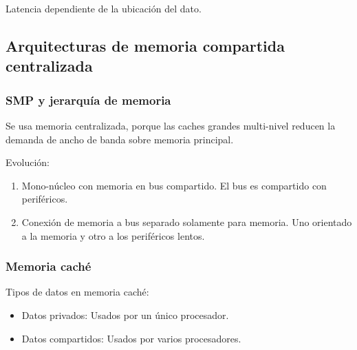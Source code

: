 \documentclass[12pt, twoside, openright]{report} %
\begin{document}
\begin{itemize}
\begin{itemize}
\begin{itemize}
        Latencia dependiente de la ubicación del dato.
        \begin{figure}[H]
          {\def\svgwidth{.6\textwidth}
  }
        \end{figure}
      \end{itemize}
     \end{itemize}

     

\subsection{Arquitecturas de memoria compartida centralizada}

\subsubsection{SMP y jerarquía de memoria}



      Se usa memoria centralizada, porque las caches grandes
      multi-nivel reducen la demanda de ancho de banda sobre memoria
      principal.

      Evolución:

      \begin{enumerate}

        
      \item
        Mono-núcleo con memoria en bus compartido. El bus es
        compartido con periféricos.
      \item
        Conexión de memoria a bus separado solamente para memoria. Uno
        orientado a la memoria y otro a los periféricos lentos.
      \end{enumerate}

      
\subsubsection{Memoria caché}


      
      Tipos de datos en memoria caché:

      \begin{itemize}
      
      \item
        Datos privados: Usados por un único procesador.
      \item
        Datos compartidos: Usados por varios procesadores.
      \end{itemize}


\end{itemize}
\end{document}
